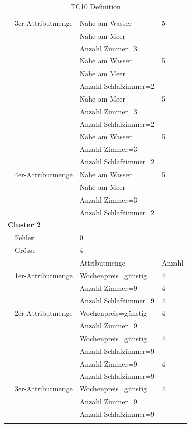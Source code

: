 \begin{longtable}{ | l | l | l | l |}
	& 3er-Attributmenge & \tabitem Nahe am Wasser & 5 \\
	& & \tabitem Nahe am Meer & \\ 
	& & \tabitem Anzahl Zimmer=3 & \\ \cline{3-4} 
	& & \tabitem Nahe am Wasser & 5 \\
	& & \tabitem Nahe am Meer & \\ 
	& & \tabitem Anzahl Schlafzimmer=2 & \\ \cline{3-4}
	& & \tabitem Nahe am Meer & 5 \\
	& & \tabitem Anzahl Zimmer=3 & \\ 
	& & \tabitem Anzahl Schlafzimmer=2 & \\ \cline{3-4}
	& & \tabitem Nahe am Wasser & 5 \\
	& & \tabitem Anzahl Zimmer=3 & \\ 
	& & \tabitem Anzahl Schlafzimmer=2 & \\ \cline{2-4}

	& 4er-Attributmenge & \tabitem Nahe am Wasser & 5 \\
	& & \tabitem Nahe am Meer & \\ 
	& & \tabitem Anzahl Zimmer=3 & \\ 
	& & \tabitem Anzahl Schlafzimmer=2 & \\ \hline

	\multicolumn{4}{|l|}{\textbf{Cluster 2}} \\ \cline{2-4} 
	& Fehler & \multicolumn{2}{|l|}{0} \\ \cline{2-4} 
	& Grösse & \multicolumn{2}{|l|}{4} \\ \cline{2-4} 
	& & Attributmenge & Anzahl \\ \cline{2-4} 
	
	& 1er-Attributmenge & \tabitem Wochenpreis=günstig & 4 \\ \cline{3-4}
	& & \tabitem Anzahl Zimmer=9 & 4 \\ \cline{3-4}
	& & \tabitem Anzahl Schlafzimmer=9 & 4 \\ \cline{2-4} 
	
	& 2er-Attributmenge & \tabitem Wochenpreis=günstig & 4 \\
	& & \tabitem Anzahl Zimmer=9 & \\ \cline{3-4}
	& & \tabitem Wochenpreis=günstig & 4 \\
	& & \tabitem Anzahl Schlafzimmer=9 & \\ \cline{3-4} 
	& & \tabitem Anzahl Zimmer=9 & 4 \\
	& & \tabitem Anzahl Schlafzimmer=9 & \\ \cline{2-4}

	& 3er-Attributmenge & \tabitem Wochenpreis=günstig & 4 \\
	& & \tabitem Anzahl Zimmer=9 & \\ 
	& & \tabitem Anzahl Schlafzimmer=9 & \\ \hline
	
	\caption{TC10 Definition}
	\centering
	\label{fig:recherche:testcases:10}
\end{longtable}


